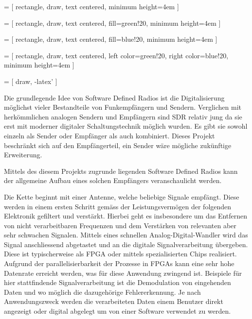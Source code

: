 
 = [
rectangle,
draw,
text centered,
minimum height=4em
]

 = [
rectangle,
draw,
text centered,
fill=green!20,
minimum height=4em
]

 = [
rectangle,
draw,
text centered,
fill=blue!20,
minimum height=4em
]

 = [
rectangle,
draw,
text centered,
left color=green!20,
right color=blue!20,
minimum height=4em
]


 = [
draw,
-latex'
]


Die grundlegende Idee von Software Defined Radios ist die Digitalisierung möglichst vieler Bestandteile von Funkempfängern und Sendern. Verglichen mit herkömmlichen analogen Sendern und Empfängern sind SDR relativ jung da sie erst mit moderner digitaler Schaltungstechnik möglich wurden. Es gibt sie sowohl einzeln als Sender oder Empfänger als auch kombiniert. Dieses Projekt beschränkt sich auf den Empfängerteil, ein Sender wäre mögliche zukünftige Erweiterung.

Mittels des diesem Projekts zugrunde liegenden Software Defined Radios kann der allgemeine Aufbau eines solchen Empfängers veranschaulicht werden.


Die Kette beginnt mit einer Antenne, welche beliebige Signale empfängt. Diese werden in einem ersten Schritt gemäss der Leistungsvermögen der folgenden Elektronik gefiltert und verstärkt. Hierbei geht es insbesondere um das Entfernen von nicht verarbeitbaren Frequenzen und dem Verstärken von relevanten aber sehr schwachen Signalen. Mittels eines schnellen Analog-Digital-Wandler wird das Signal anschliessend abgetastet und an die digitale Signalverarbeitung übergeben. Diese ist typischerweise als FPGA oder mittels spezialisierten Chips realisiert. Aufgrund der parallelisierbarkeit der Prozesse in FPGAs kann eine sehr hohe Datenrate erreicht werden, was für diese Anwendung zwingend ist. Beispiele für hier stattfindende Signalverarbeitung ist die Demodulation von eingehenden Daten und wo möglich die dazugehörige Fehlererkennung. Je nach Anwendungszweck werden die verarbeiteten Daten einem Benutzer direkt angezeigt oder digital abgelegt um von einer Software verwendet zu werden.


